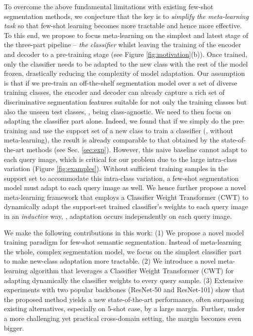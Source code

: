 \documentclass[10pt,twocolumn,letterpaper]{article}
\begin{document}
To overcome the above fundamental limitations with existing few-shot segmentation methods, we conjecture that the key is to {\em simplify the meta-learning task} so that few-shot learning becomes more tractable and hence more effective. 
To this end,  we propose to focus meta-learning on the simplest and latest stage of the three-part pipeline -- {\em the classifier} whilst leaving the training of the encoder and decoder to a pre-training stage (see Figure \ref{fig:motivation}(b)). Once trained, only the classifier needs to be adapted to the new class with the rest of the model frozen, drastically reducing the complexity of model adaptation.  Our assumption is that if we pre-train an off-the-shelf segmentation model over a set of diverse training classes, the encoder and decoder can already capture a rich set of discriminative segmentation features suitable for not only the training classes but also the unseen test classes, \ie, being class-agnostic. We need to then focus on adapting the classifier part alone. Indeed, we found that if we simply do the pre-training and use the support set of a new class to train a classifier (\ie, without meta-learning), the result is already comparable to that obtained by the state-of-the-art methods (see Sec. \ref{sec:exp}). 
However, this naive baseline cannot adapt to each query image, which is critical for our problem due to the large intra-class variation (Figure \ref{fig:examples}). Without sufficient training samples in the support set to accommodate this intra-class variation, a few-shot segmentation model must adapt to each query image as well.   We hence further propose a novel meta-learning framework that employs a Classifier Weight Transformer (CWT) to dynamically adapt the support-set trained classifier's weights to each query image in an {\em inductive} way, \ie, adaptation occurs independently on each query image. 



We make the following contributions in this work:
(1) We propose a novel model training paradigm for few-shot semantic segmentation. Instead of meta-learning the whole, complex segmentation model, we focus on the simplest classifier part to make new-class adaptation more tractable.
(2) We introduce a novel meta-learning algorithm that leverages a Classifier Weight Transformer (CWT) for adapting dynamically the classifier weights to every query sample.
(3) Extensive experiments with two popular backbones (ResNet-50 and ResNet-101) show that the proposed method yields a new state-of-the-art performance, often surpassing existing alternatives, especially on 5-shot case, by a large margin. Further, under a more challenging yet practical cross-domain setting, the margin becomes even bigger.
\end{document}
